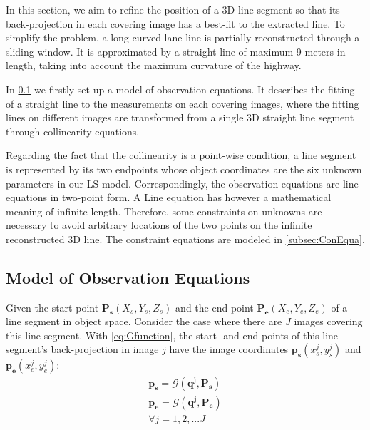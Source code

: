 In this section, we aim to refine the position of a 3D line segment so that its back-projection in each covering image has a best-fit to the extracted line. To simplify the problem, a long curved lane-line is partially reconstructed through a sliding window. It is approximated by a straight line of maximum 9 meters in length, taking into account the maximum curvature of the highway.

In \cref{subsec:ObsEqua} we firstly set-up a model of observation equations. It describes the fitting of a straight line to the measurements on each covering images, where the fitting lines on different images are transformed from a single 3D straight line segment through collinearity equations. 

Regarding the fact that the collinearity is a point-wise condition, a line segment is represented by its two endpoints whose object coordinates are the six unknown parameters in our LS model. Correspondingly, the observation equations are line equations in two-point form. A Line equation has however a mathematical meaning of infinite length. Therefore, some constraints on unknowns are necessary to avoid arbitrary locations of the two points on the infinite reconstructed 3D line. The constraint equations are modeled in \cref{subsec:ConEqua}.





\subsection{Model of Observation Equations}
\label{subsec:ObsEqua}

Given the start-point $\mathbf{P_s}(X_s,Y_s,Z_s)$ and the end-point $\mathbf{P_e}(X_e,Y_e,Z_e)$ of a line segment in object space. Consider the case where there are $J$ images covering this line segment. With \cref{eq:Gfunction}, the start- and end-points of this line segment's back-projection in image $j$ have the image coordinates $\mathbf{p_s}(x^j_s,y^j_s)$ and $\mathbf{p_e}(x^j_e,y^j_e)$:
\begin{equation} \label{eq:obsmodel-collinearity}
\begin{split}
\mathbf{p_s} = \mathcal{G}(\mathbf{q^j},\mathbf{P_s})\\
\mathbf{p_e} = \mathcal{G}(\mathbf{q^j},\mathbf{P_e})\\
\forall j=1,2,...J
\end{split}
\end{equation}







